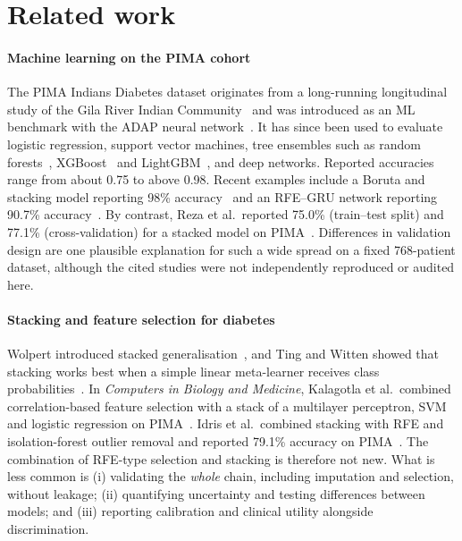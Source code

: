\section{Related work}
\label{sec:related}

\paragraph{Machine learning on the PIMA cohort}
The PIMA Indians Diabetes dataset originates from a long-running longitudinal study of the Gila River Indian Community~\cite{knowler1978} and was introduced as an ML benchmark with the ADAP neural network~\cite{smith1988adap}. It has since been used to evaluate logistic regression, support vector machines, tree ensembles such as random forests~\cite{breiman2001rf}, XGBoost~\cite{chen2016xgboost} and LightGBM~\cite{ke2017lightgbm}, and deep networks. Reported accuracies range from about 0.75 to above 0.98. Recent examples include a Boruta and stacking model reporting 98\% accuracy~\cite{zhou2023boruta} and an RFE--GRU network reporting 90.7\% accuracy~\cite{shams2025rfegru}. By contrast, Reza et al.\ reported 75.0\% (train--test split) and 77.1\% (cross-validation) for a stacked model on PIMA~\cite{reza2024stacking}. Differences in validation design are one plausible explanation for such a wide spread on a fixed 768-patient dataset, although the cited studies were not independently reproduced or audited here.

\paragraph{Stacking and feature selection for diabetes}
Wolpert introduced stacked generalisation~\cite{wolpert1992stacked}, and Ting and Witten showed that stacking works best when a simple linear meta-learner receives class probabilities~\cite{ting1999issues}. In \emph{Computers in Biology and Medicine}, Kalagotla et al.\ combined correlation-based feature selection with a stack of a multilayer perceptron, SVM and logistic regression on PIMA~\cite{kalagotla2021stacking}. Idris et al.\ combined stacking with RFE and isolation-forest outlier removal and reported 79.1\% accuracy on PIMA~\cite{idris2024stacking}. The combination of RFE-type selection and stacking is therefore not new. What is less common is (i) validating the \emph{whole} chain, including imputation and selection, without leakage; (ii) quantifying uncertainty and testing differences between models; and (iii) reporting calibration and clinical utility alongside discrimination.

